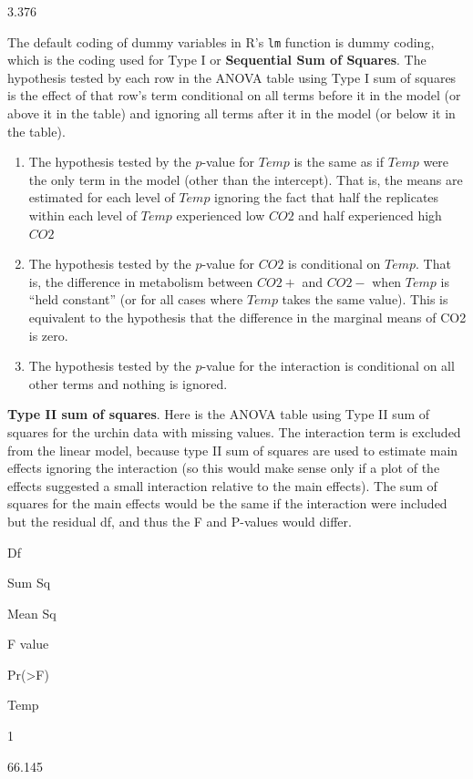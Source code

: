 \documentclass[]{book}
\begin{document}
3.376

The default coding of dummy variables in R's \texttt{lm} function is
dummy coding, which is the coding used for Type I or \textbf{Sequential
Sum of Squares}. The hypothesis tested by each row in the ANOVA table
using Type I sum of squares is the effect of that row's term conditional
on all terms before it in the model (or above it in the table) and
ignoring all terms after it in the model (or below it in the table).

\begin{enumerate}
\def\labelenumi{\arabic{enumi}.}
\item
  The hypothesis tested by the \(p\)-value for \(Temp\) is the same as
  if \(Temp\) were the only term in the model (other than the
  intercept). That is, the means are estimated for each level of
  \(Temp\) ignoring the fact that half the replicates within each level
  of \(Temp\) experienced low \(CO2\) and half experienced high \(CO2\)
\item
  The hypothesis tested by the \(p\)-value for \(CO2\) is conditional on
  \(Temp\). That is, the difference in metabolism between \(CO2+\) and
  \(CO2-\) when \(Temp\) is ``held constant'' (or for all cases where
  \(Temp\) takes the same value). This is equivalent to the hypothesis
  that the difference in the marginal means of CO2 is zero.
\item
  The hypothesis tested by the \(p\)-value for the interaction is
  conditional on all other terms and nothing is ignored.
\end{enumerate}

\textbf{Type II sum of squares}. Here is the ANOVA table using Type II
sum of squares for the urchin data with missing values. The interaction
term is excluded from the linear model, because type II sum of squares
are used to estimate main effects ignoring the interaction (so this
would make sense only if a plot of the effects suggested a small
interaction relative to the main effects). The sum of squares for the
main effects would be the same if the interaction were included but the
residual df, and thus the F and P-values would differ.

Df

Sum Sq

Mean Sq

F value

Pr(\textgreater{}F)

Temp

1

66.145
\end{document}
